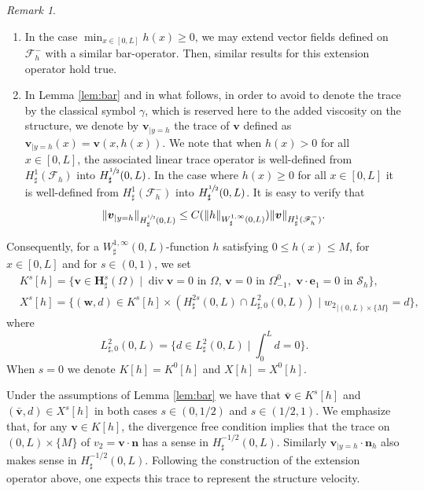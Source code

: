 \documentclass[JEP,XML,SOM,Unicode,NoFloatCountersInSection]{cedram}
\let\mathcal\mathscr
\newenvironment{enumeratei}
{\bgroup\def\theenumi{\roman{enumi}}\def\theenumii{\arabic{enumii}}\begin{enumerate}}
{\end{enumerate}\egroup}
\theoremstyle{remark}
\newtheorem{remark}[theorem]{Remark}
\theoremstyle{definition}
\newcommand{\vg}{\boldsymbol{v}}
\DeclareMathOperator{\DIV}{div}
\newcommand{\wg}{\boldsymbol{w}}
\newcommand{\BS}[1]{\boldsymbol{#1}}
\let\CM\Omega
\begin{document}
\skpt
\begin{remark}
\label{rem:domaine}
\begin{enumeratei}
\item In the case $\min_{x\in [0, L]} h(x)\geq 0$, we may extend vector fields defined on $\mathcal{F}^-_h$ with a similar bar-operator. Then, similar results for this extension operator hold true.

\item In Lemma \ref{lem:bar} and in what follows, in order to avoid to denote the trace by the classical symbol $\gamma$, which is reserved here to the added viscosity on the structure, we denote by ${\boldsymbol v}_{|{y=h}}$ the trace of $\vg$ defined as ${\boldsymbol v}_{|{y=h}}(x)=\vg(x, h(x))$. We note that when $h(x)>0$ for all $x\in [0, L]$, the associated linear trace operator is well-defined from $H_\sharp^1(\mathcal{F}_h)$ into $H_\sharp^{\sfrac{1}{2}}(0, L)$. In the case where $h(x)\geq0$ for all $x\in [0, L]$ it is well-defined from $H_\sharp^1(\mathcal{F}^-_h)$ into $H_\sharp^{\sfrac{1}{2}}(0, L)$. It is easy to verify that
\begin{equation}
\label{est:trace}
\|\vg_{|{y=h}}\|_{H^{\sfrac{1}{2}}_\sharp(0, L)}\leq C(\|h\|_{W_\sharp^{1, \infty}(0, L)}) \|\vg\|_{H^1_\sharp(\mathcal{F}^-_h)}.
\end{equation}
\end{enumeratei}

\end{remark}
Consequently, for a $W^{1, \infty}_{\sharp}(0,L)$-function $h$ satisfying $0 \leq h(x) \leq M$, for $x\in [0, L]$ and for $s \in (0,1)$, we set
\begin{align}
&K^{s}[h]=\{\vg\in \BS{H}^{s}_{\sharp}(\CM)\mid \DIV{\vg}=0\text{ in }\CM,\,\vg=0\text{ in }\Omega_{-1}^{0},\,\,\vg\cdot\BS{e}_{1}=0\text{ in }\mathcal{S}_{h}\},\label{espace.Ks}\\
&X^{s}[h]=\{(\wg,d)\in K^{s}[h]\times (H^{2s}_{\sharp}(0,L)\cap L_{\sharp, 0}^{2}(0,L))\mid {w_{2}}_{|{(0, L)\times \{M\}}}=d\},\label{espace.Xs}
\end{align}
where
\[\textstyle
L_{\sharp, 0}^{2}(0,L)= \bigl\{d\in L_{\sharp}^{2}(0,L) \mid \int_0^L d =0\bigl\}.
\]
When $s=0$ we denote $K[h] = K^0[h]$ and $X[h] = X^0[h]$.

Under the assumptions of Lemma \ref{lem:bar}
we have that $\bar{\vg} \in K^s[h]$ and $(\bar{\vg},d) \in X^s[h]$ in both cases $s \in (0,1/2)$ and $s \in (1/2,1)$.
We emphasize that, for any $\vg\in K[h]$, the divergence free condition implies that the trace on ${(0, L)\times \{M\}}$ of ${v_{2}}=\vg\cdot\BS{n}$ has a sense in $H^{-1/2}_\sharp(0, L)$. Similarly $\vg_{|{y=h}}\cdot \BS{n}_h$ also makes sense in $H^{-1/2}_\sharp(0, L)$. Following the construction of the extension operator above, one expects this trace to represent the structure velocity.
\end{document}
